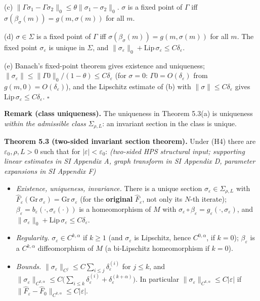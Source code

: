 \documentclass[11pt,a4paper]{article}
\theoremstyle{plain}
\theoremstyle{definition}
\theoremstyle{remark}
\numberwithin{equation}{section}
\numberwithin{figure}{section}
\begin{document}
(c) $\|\Gamma\sigma_1-\Gamma\sigma_2\|_0\le\theta\|\sigma_1-\sigma_2\|_0$. $\sigma$ is a fixed point of $\Gamma$ iff $\sigma(\beta_\sigma(m))=g(m,\sigma(m))$ for all $m$.

(d) $\sigma\in\Sigma$ is a fixed point of $\Gamma$ iff $\sigma(\beta_\sigma(m))=g(m,\sigma(m))$ for all $m$. The fixed point $\sigma_\varepsilon$ is unique in $\Sigma$, and $\|\sigma_\varepsilon\|_0+\mathrm{Lip}\,\sigma_\varepsilon\le C\delta_\varepsilon$.

(e) Banach's fixed-point theorem gives existence and uniqueness; $\|\sigma_\varepsilon\|\le\|\Gamma0\|_0/(1-\theta)\le C\delta_\varepsilon$ (for $\sigma=0$: $\Gamma0=O(\delta_\varepsilon)$ from $g(m,0)=O(\delta_\varepsilon)$), and the Lipschitz estimate of (b) with $\|\sigma\|\le C\delta_\varepsilon$ gives $\mathrm{Lip}\,\sigma_\varepsilon\le C\delta_\varepsilon$. $\square$

\textbf{Remark (class uniqueness).} The uniqueness in Theorem 5.3(a) is uniqueness \textit{within the admissible class} $\Sigma_{\rho,L}$: an invariant section in the class is unique.

\textbf{Theorem 5.3 (two-sided invariant section theorem).} Under (H4) there are $\varepsilon_0,\rho,L>0$ such that for $|\varepsilon|<\varepsilon_0$: \textit{(two-sided HPS structural input; supporting linear estimates in SI Appendix A, graph transform in SI Appendix D, parameter expansions in SI Appendix F)}

\begin{itemize}
    \item[(a)] \textit{Existence, uniqueness, invariance.} There is a unique section $\sigma_\varepsilon\in\Sigma_{\rho,L}$ with $\widehat F_\varepsilon(\mathrm{Gr}\,\sigma_\varepsilon)=\mathrm{Gr}\,\sigma_\varepsilon$ (for the \textbf{original} $\widehat F_\varepsilon$, not only its $N$-th iterate); $\beta_\varepsilon=b_\varepsilon(\cdot,\sigma_\varepsilon(\cdot))$ is a homeomorphism of $M$ with $\sigma_\varepsilon\circ\beta_\varepsilon=g_\varepsilon(\cdot,\sigma_\varepsilon)$, and $\|\sigma_\varepsilon\|_0+\mathrm{Lip}\,\sigma_\varepsilon\le C\delta_\varepsilon$.
    \item[(b)] \textit{Regularity.} $\sigma_\varepsilon\in C^{k,\alpha}$ if $k\ge1$ (and $\sigma_\varepsilon$ is Lipschitz, hence $C^{0,\alpha}$, if $k=0$); $\beta_\varepsilon$ is a $C^{k,\alpha}$ diffeomorphism of $M$ (a bi-Lipschitz homeomorphism if $k=0$).
    \item[(c)] \textit{Bounds.} $\|\sigma_\varepsilon\|_{C^j}\le C\sum_{i\le j}\delta^{(i)}_\varepsilon$ for $j\le k$, and $\|\sigma_\varepsilon\|_{C^{k,\alpha}}\le C\big(\sum_{i\le k}\delta^{(i)}_\varepsilon+\delta^{(k+\alpha)}_\varepsilon\big)$. In particular $\|\sigma_\varepsilon\|_{C^{k,\alpha}}\le C|\varepsilon|$ if $\|\widehat F_\varepsilon-\widehat F_0\|_{C^{k,\alpha}}\le C|\varepsilon|$.
\end{itemize}
\end{document}
